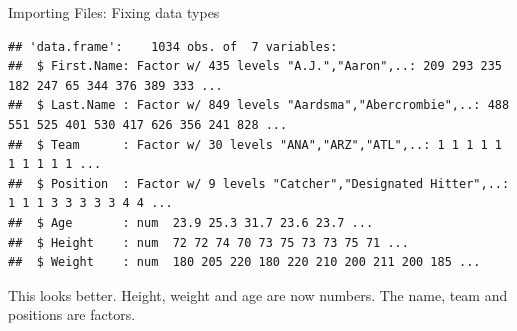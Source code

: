 \documentclass[
  9pt,
  ignorenonframetext,
]{beamer}
\newenvironment{Shaded}{\begin{snugshade}}{\end{snugshade}}
\newcommand{\CommentTok}[1]{\textcolor[rgb]{0.50,0.62,0.50}{#1}}
\newcommand{\KeywordTok}[1]{\textcolor[rgb]{0.94,0.87,0.69}{#1}}
\newcommand{\NormalTok}[1]{\textcolor[rgb]{0.80,0.80,0.80}{#1}}
\newcommand{\OperatorTok}[1]{\textcolor[rgb]{0.94,0.94,0.82}{#1}}
\newcommand{\OtherTok}[1]{\textcolor[rgb]{0.94,0.94,0.56}{#1}}
\newcommand{\StringTok}[1]{\textcolor[rgb]{0.80,0.58,0.58}{#1}}
\begin{document}
\begin{frame}[fragile]{Importing Files: Fixing data types}
\protect\hypertarget{importing-files-fixing-data-types}{}
\footnotesize

\begin{Shaded}
\end{Shaded}

\begin{verbatim}
## 'data.frame':    1034 obs. of  7 variables:
##  $ First.Name: Factor w/ 435 levels "A.J.","Aaron",..: 209 293 235 182 247 65 344 376 389 333 ...
##  $ Last.Name : Factor w/ 849 levels "Aardsma","Abercrombie",..: 488 551 525 401 530 417 626 356 241 828 ...
##  $ Team      : Factor w/ 30 levels "ANA","ARZ","ATL",..: 1 1 1 1 1 1 1 1 1 1 ...
##  $ Position  : Factor w/ 9 levels "Catcher","Designated Hitter",..: 1 1 1 3 3 3 3 3 4 4 ...
##  $ Age       : num  23.9 25.3 31.7 23.6 23.7 ...
##  $ Height    : num  72 72 74 70 73 75 73 73 75 71 ...
##  $ Weight    : num  180 205 220 180 220 210 200 211 200 185 ...
\end{verbatim}

\vfill

This looks better. Height, weight and age are now numbers. The name,
team and positions are factors.
\end{frame}
\end{document}
